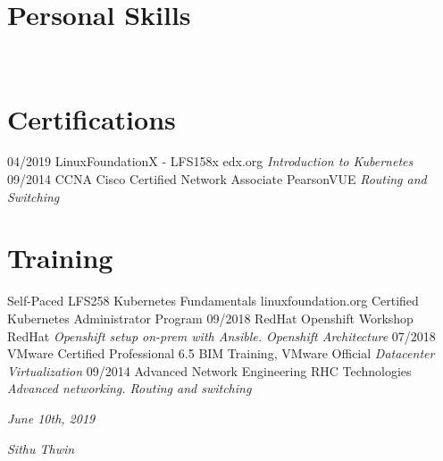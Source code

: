 \documentclass[]{friggeri-cv}
\begin{document}
\begin{aside}
~
~
~
  \section{Personal Skills}
	~
\end{aside}
\section{Certifications}
\begin{entrylist}
	\entry
	{04/2019}
	{LinuxFoundationX - LFS158x}
	{edx.org}
	{\emph{Introduction to Kubernetes}}
	\entry
	{09/2014}
	{CCNA Cisco Certified Network Associate}
	{PearsonVUE}
	{\emph{Routing and Switching}}
\end{entrylist}

\section{Training}
\begin{entrylist}
	\entry
	{Self-Paced}
	{LFS258 Kubernetes Fundamentals}
	{linuxfoundation.org}
	{Certified Kubernetes Administrator Program}
	\entry
	{09/2018}
	{RedHat Openshift Workshop}
	{RedHat}
	{\emph{Openshift setup on-prem with Ansible. Openshift Architecture}}	\entry
	{07/2018}
	{VMware Certified Professional 6.5}
	{BIM Training, VMware Official}
	{\emph{Datacenter Virtualization}}
	\entry
	{09/2014}
	{Advanced Network Engineering}
	{RHC Technologies}
	{\emph{Advanced networking. Routing and switching}}
\end{entrylist}

\begin{flushleft}
\emph{June 10th, 2019}
\end{flushleft}
\begin{flushright}
\emph{Sithu Thwin}
\end{flushright}
\end{document}
